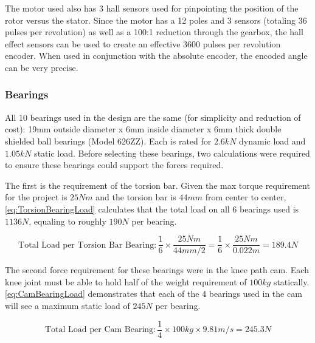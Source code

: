 The motor used also has 3 hall sensors used for pinpointing the position of the rotor versus the stator. Since the motor has a 12 poles and 3 sensors (totaling 36 pulses per revolution) as well as a 100:1 reduction through the gearbox, the hall effect sensors can be used to create an effective 3600 pulses per revolution encoder. When used in conjunction with the absolute encoder, the encoded angle can be very precise.


\subsubsection{Bearings}
\label{sec:BearingsAndCalcs}
All 10 bearings used in the design are the same (for simplicity and reduction of cost): 19mm outside diameter x 6mm inside diameter x 6mm thick double shielded ball bearings (Model 626ZZ). Each is rated for \(2.6kN\) dynamic load and \(1.05kN\) static load. Before selecting these bearings, two calculations were required to ensure these bearings could support the forces required.

The first is the requirement of the torsion bar. Given the max torque requirement for the project is \(25Nm\) and the torsion bar is \(44mm\) from center to center, \autoref{eq:TorsionBearingLoad} calculates that the total load on all 6 bearings used is \(1136N\), equaling to roughly \(190N\) per bearing.

\begin{equation}
    \text{Total Load per Torsion Bar Bearing}: \frac{1}{6} \times \frac{25Nm}{44mm / 2} = \frac{1}{6} \times \frac{25Nm}{0.022m} = 189.4N
    \label{eq:TorsionBearingLoad}
\end{equation}

The second force requirement for these bearings were in the knee path cam. Each knee joint must be able to hold half of the weight requirement of \(100kg\) statically. \autoref{eq:CamBearingLoad} demonstrates that each of the 4 bearings used in the cam will see a maximum static load of \(245N\) per bearing.

\begin{equation}
    \text{Total Load per Cam Bearing}: \frac{1}{4} \times 100kg \times 9.81m/s = 245.3N
    \label{eq:CamBearingLoad}
\end{equation}

